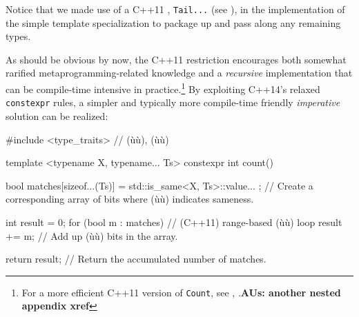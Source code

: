 \noindent Notice that we made use of a C++11 ,
\lstinline!Tail...! (see ), in the
implementation of the simple template specialization to package up and
pass along any remaining types.

As should be obvious by now, the C++11 restriction encourages both
somewhat rarified metaprogramming-related knowledge and a
\emph{recursive} implementation that can be compile-time intensive in
practice.{\cprotect\footnote{For a more efficient C++11 version of
\lstinline!Count!, see , .\textbf{AUs: another nested appendix xref}}} By exploiting C++14's relaxed
\lstinline!constexpr! rules, a simpler and typically more compile-time
friendly \emph{imperative} solution can be realized:

\begin{emcppshiddenlisting}[emcppsbatch=e5]
#include <type_traits>  // (ù{}ù), (ù{}ù)
\end{emcppshiddenlisting}
\begin{emcppslisting}[emcppsbatch=e5,emcppsstandards={c++14}]
template <typename X, typename... Ts>
constexpr int count()
{
    bool matches[sizeof...(Ts)] = { std::is_same<X, Ts>::value... };
        // Create a corresponding array of bits where (ù{}ù) indicates sameness.

    int result = 0;
    for (bool m : matches)  // (C++11) range-based (ù{}ù) loop
    {
        result += m;        // Add up (ù{}ù) bits in the array.
    }

    return result;  // Return the accumulated number of matches.
}
\end{emcppslisting}
    
